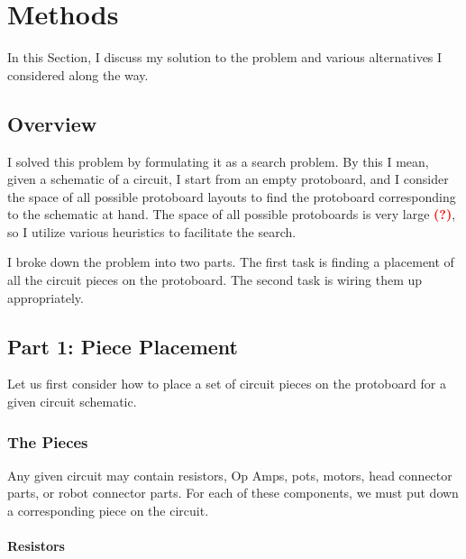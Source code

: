 
\chapter{Methods}

In this Section, I discuss my solution to the problem and various alternatives I
considered along the way.

\section{Overview}

I solved this problem by formulating it as a search problem. By this I mean,
given a schematic of a circuit, I start from an empty protoboard, and I consider
the space of all possible protoboard layouts to find the protoboard
corresponding to the schematic at hand. The space of all possible protoboards is
very large \textcolor{red}{\textbf{(?)}}, so I utilize various heuristics to
facilitate the search.

I broke down the problem into two parts. The first task is finding a placement
of all the circuit pieces on the protoboard. The second task is wiring them up
appropriately.

\section{Part 1: Piece Placement}

Let us first consider how to place a set of circuit pieces on the protoboard for
a given circuit schematic.

\subsection{The Pieces}

Any given circuit may contain resistors, Op Amps, pots, motors, head connector
parts, or robot connector parts. For each of these components, we must put down
a corresponding piece on the circuit.

\subsubsection{Resistors}
\label{sec:resistor_pieces}

